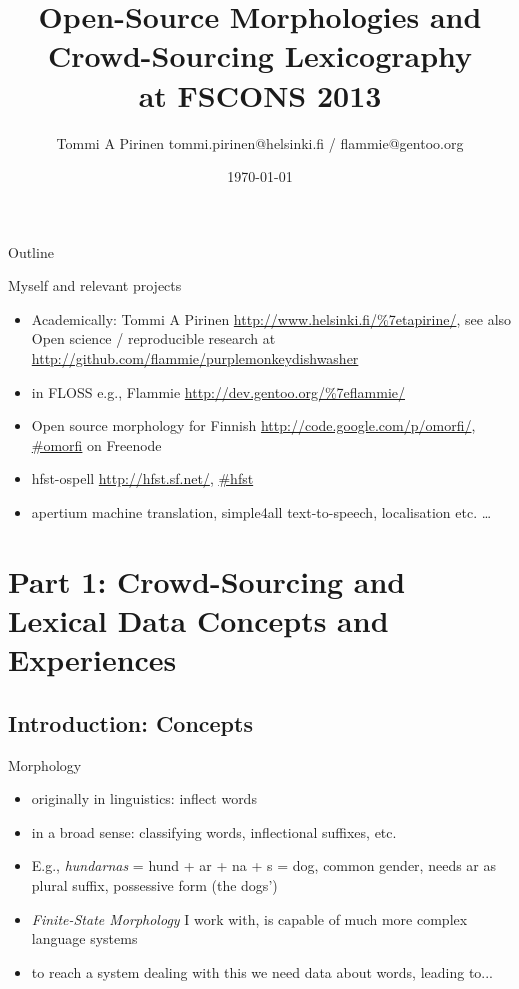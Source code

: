 \documentclass[t,12pt]{beamer}
\title[Open- and Crowd-sourced Lexicography]{Open-Source Morphologies and Crowd-Sourcing Lexicography\\\scriptsize{at FSCONS 2013}}
\author[Tommi A Pirinen]{Tommi A Pirinen \scriptsize \guilsinglleft{}tommi.pirinen@helsinki.fi\guilsinglright{} / \guilsinglleft{}flammie@gentoo.org\guilsinglright{}}
\institute[University of Helsinki]{Department of Speech Sciences\\University of Helsinki}
\date{\today}
\begin{document}

\HyTitle

\begin{frame}{Outline}
    \tableofcontents
\end{frame}

\begin{frame}{Myself and relevant projects}
    \begin{itemize}
        \item Academically: Tommi A Pirinen \url{http://www.helsinki.fi/\%7etapirine/}, see also Open science / reproducible research at \url{http://github.com/flammie/purplemonkeydishwasher}
        \item in FLOSS e.g., Flammie \url{http://dev.gentoo.org/\%7eflammie/}
        \item Open source morphology for Finnish \url{http://code.google.com/p/omorfi/}, \url{\#omorfi} on Freenode
        \item hfst-ospell \url{http://hfst.sf.net/}, \url{\#hfst}
        \item apertium machine translation, simple4all text-to-speech, 
            localisation etc. \ldots
    \end{itemize}
\end{frame}

\section{Part 1: Crowd-Sourcing and Lexical Data Concepts and Experiences}

\subsection{Introduction: Concepts}

\begin{frame}{Morphology}
    \begin{itemize}
        \item originally in linguistics: inflect words
        \item in a broad sense: classifying words, inflectional suffixes, etc.
        \item E.g., \emph{hundarnas} = hund + ar + na + s = dog, common gender,
            needs ar as plural suffix, possessive form (the dogs')
        \item \emph{Finite-State Morphology} I work with, is capable of
            much more complex language systems
        \item to reach a system dealing with this we need data about
            words, leading to...
    \end{itemize}
\end{frame}
\end{document}
